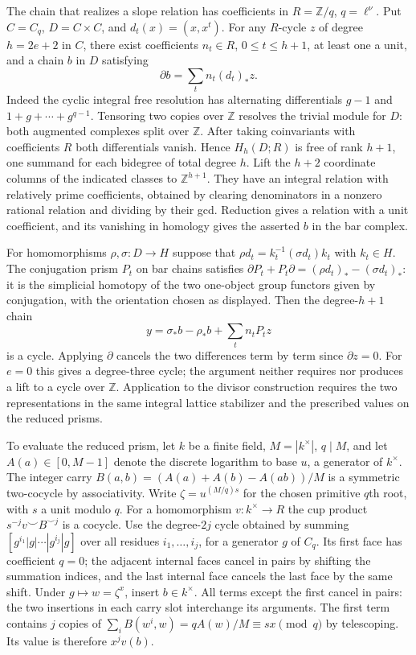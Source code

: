\documentclass[11pt]{amsart}
\theoremstyle{definition}
\theoremstyle{remark}
\begin{document}
The chain that realizes a slope relation has coefficients in
$R=\mathbb Z/q$, $q=\ell^\nu$. Put $C=C_q$, $D=C\times C$, and
$d_t(x)=(x,x^t)$. For any $R$-cycle $z$ of degree $h=2e+2$ in
$C$, there exist coefficients $n_t\in R$, $0\le t\le h+1$, at
least one a unit, and a chain $b$ in $D$ satisfying
\[
 \partial b=\sum_t n_t(d_t)_*z.
\]
Indeed the cyclic integral free resolution has alternating
differentials $g-1$ and $1+g+\cdots+g^{q-1}$. Tensoring two copies
over $\mathbb Z$ resolves the trivial module for $D$: both augmented
complexes split over $\mathbb Z$. After taking coinvariants with
coefficients $R$ both differentials vanish. Hence $H_h(D;R)$ is free
of rank $h+1$, one summand for each bidegree of total degree $h$.
Lift the $h+2$ coordinate columns of the indicated classes to
$\mathbb Z^{h+1}$. They have an integral relation with relatively
prime coefficients, obtained by clearing denominators in a nonzero
rational relation and dividing by their gcd. Reduction gives a
relation with a unit coefficient, and its vanishing in homology
gives the asserted $b$ in the bar complex.

For homomorphisms $\rho,\sigma:D\to H$ suppose that
$\rho d_t=k_t^{-1}(\sigma d_t)k_t$ with $k_t\in H$.
The conjugation prism $P_t$ on bar chains satisfies
$\partial P_t+P_t\partial=(\rho d_t)_*-(\sigma d_t)_*$:
it is the simplicial homotopy of the two one-object group functors
given by conjugation, with the orientation chosen as displayed.
Then the degree-$h+1$ chain
\[
 y=\sigma_*b-\rho_*b+\sum_t n_t P_tz
\]
is a cycle. Applying $\partial$ cancels the two differences term by
term since $\partial z=0$. For $e=0$ this gives a degree-three cycle;
the argument neither requires nor produces a lift to a cycle over
$\mathbb Z$. Application to the divisor construction requires the two
representations in the same integral lattice stabilizer and the
prescribed values on the reduced prisms.

To evaluate the reduced prism, let $k$ be a finite field,
$M=|k^\times|$, $q\mid M$, and let $A(a)\in[0,M-1]$ denote the
discrete logarithm to base $u$, a generator of $k^\times$.
The integer carry $B(a,b)=(A(a)+A(b)-A(ab))/M$ is a symmetric
two-cocycle by associativity. Write $\zeta=u^{(M/q)s}$ for the
chosen primitive $q$th root, with $s$ a unit modulo $q$.
For a homomorphism $v:k^\times\to R$ the cup product
$s^{-j}v\smile B^{\smile j}$ is a cocycle. Use the degree-$2j$
cycle obtained by summing $[g^{i_1}|g|\cdots|g^{i_j}|g]$ over
all residues $i_1,\ldots,i_j$, for a generator $g$ of $C_q$.
Its first face has coefficient $q=0$; the adjacent internal faces
cancel in pairs by shifting the summation indices, and the last
internal face cancels the last face by the same shift.
Under $g\mapsto w=\zeta^x$, insert $b\in k^\times$. All terms except the first cancel in pairs:
the two insertions in each carry slot interchange its arguments.
The first term contains $j$ copies of $\sum_i B(w^i,w)=qA(w)/M\equiv sx\pmod q$ by telescoping.
Its value is therefore $x^jv(b)$.
\end{document}
